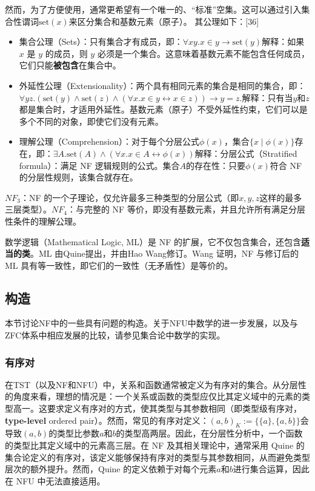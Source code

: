 然而，为了方便使用，通常更希望有一个唯一的、“标准”空集。这可以通过引入集合性谓词\( \text{set}(x)\)来区分集合和基数元素（原子）。  
其公理如下：[36]
\begin{itemize}
\item 集合公理（Sets）：只有集合才有成员，即：\(\forall x y . x \in y \to \text{set}(y)\)解释：如果 \( x \) 是 \( y \) 的成员，则 \( y \) 必须是一个集合。这意味着基数元素不能包含任何成员，它们只能\textbf{被包含}在集合中。
\item 外延性公理（Extensionality）：两个具有相同元素的集合是相同的集合，即：\(\forall y z . (\text{set}(y) \land \text{set}(z) \land (\forall x . x \in y \leftrightarrow x \in z)) \to y = z.\)解释：只有当\( y \)和\( z \)都是集合时，才适用外延性。基数元素（原子）不受外延性约束，它们可以是多个不同的对象，即使它们没有元素。
\item 理解公理（Comprehension）：对于每个分层公式\(\phi(x)\)，集合\(\{x \mid \phi(x)\}\)存在，即：\(\exists A . \text{set}(A) \land (\forall x . x \in A \leftrightarrow \phi(x))\)解释：分层公式（Stratified formula）：满足 NF 逻辑规则的公式。集合\(A\)的存在性：只要\(\phi(x)\)符合 NF 的分层性规则，该集合就存在。
\end{itemize}
\(NF_3\)：NF 的一个子理论，仅允许最多三种类型的分层公式（即\(x, y, z\)这样的最多三层类型）。\(NF_4\)：与完整的 NF 等价，即没有基数元素，并且允许所有满足分层性条件的理解公理。

数学逻辑（Mathematical Logic, ML）是 NF 的扩展，它不仅包含集合，还包含\textbf{适当的类}。ML 由Quine提出，并由Hao Wang修订。Wang 证明，NF 与修订后的 ML 具有等一致性，即它们的一致性（无矛盾性）是等价的。
\subsection{构造} 
本节讨论NF中的一些具有问题的构造。关于NFU中数学的进一步发展，以及与ZFC体系中相应发展的比较，请参见集合论中数学的实现。
\subsubsection{有序对}  
在TST（以及NF和NFU）中，关系和函数通常被定义为有序对的集合。从分层性的角度来看，理想的情况是：一个关系或函数的类型应仅比其定义域中的元素的类型高一。这要求定义有序对的方式，使其类型与其参数相同（即类型级有序对，\textbf{type-level} ordered pair）。然而，常见的有序对定义：\((a, b)_K := \{\{a\},\{a, b\}\}\)会导致\((a, b)\)的类型比参数\(a\)和\(b\)的类型高两层。因此，在分层性分析中，一个函数的类型比其定义域中的元素高三层。在 NF 及其相关理论中，通常采用 Quine 的集合论定义的有序对，该定义能够保持有序对的类型与其参数相同，从而避免类型层次的额外提升。然而，Quine 的定义依赖于对每个元素\(a\)和\(b\)进行集合运算，因此在 NFU 中无法直接适用。

